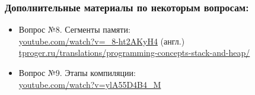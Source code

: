 \documentclass{article}
\begin{document}
\subsubsection*{Дополнительные материалы по некоторым вопросам:}
\begin{itemize}

\item Вопрос №8. Сегменты памяти:\\
\href{https://www.youtube.com/watch?v=_8-ht2AKyH4}{youtube.com/watch?v=\_8-ht2AKyH4}  (англ.)\\
\href{https://tproger.ru/translations/programming-concepts-stack-and-heap/}{tproger.ru/translations/programming-concepts-stack-and-heap/}
\item Вопрос №9. Этапы компиляции:\\
\href{https://www.youtube.com/watch?v=ylA55D4B4_M}{youtube.com/watch?v=ylA55D4B4\_M}

\end{itemize}
\end{document}
